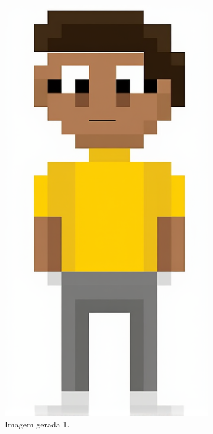 \begin{figure}[htbp]
\begin{subfigure}{0.25\linewidth}
        \includegraphics[width=1\linewidth]{figs/cgDream/res_img_fluxDev1a.png}
        \caption{\small Imagem gerada 1.}
        \label{fig:cgDream1b}
    \end{subfigure}
    \begin{subfigure}{0.25\linewidth}

\end{subfigure}
\end{figure}
